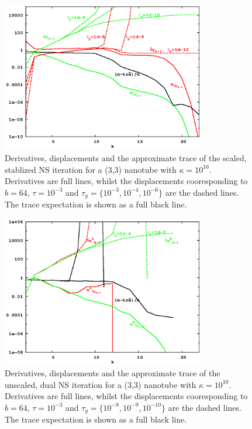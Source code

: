 \documentclass[letterpaper,twocolumn,amsmath,amsfont,amssymb,english,aps,jcp,preprintnumbers,groupaddress,nofootinbib,tightenlines]{revtex4}
\begin{document}


\begin{figure}[h]
\includegraphics[width=3.5in]{fig_33_tube_cond_10_scaled/33_tube_k10_scale_dual.eps}
\caption{Derivatives, displacements and the approximate trace of the scaled, stablized NS iteration for a
(3,3) nanotube with $\kappa =10^{10}$.
Derivatives are full lines, whilst the displacements cooresponding to $b=64$,
$\tau=10^{-3}$ and $\tau_y=\{10^{-3},10^{-4},10^{-6}\}$
are the dashed lines.  The trace expectation is shown as a full black line. }
\end{figure}

\begin{figure}[h]
\includegraphics[width=3.5in]{fig_33_tube_cond_10_scaled/33_tube_k10_scale_stab.eps}
\caption{Derivatives, displacements and the approximate trace of the unscaled, dual NS iteration for a (3,3) nanotube with $\kappa =10^{10}$.
Derivatives are full lines, whilst the displacements cooresponding to $b=64$, $\tau=10^{-3}$ and $\tau_y=\{10^{-8}, 10^{-9}, 10^{-10}\}$
are the dashed lines.  The trace expectation is shown as a full black line. }
\end{figure}
\end{document}

